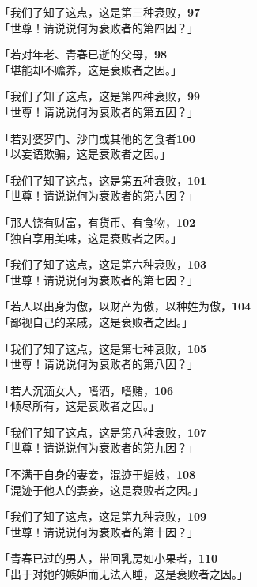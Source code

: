 「我们了知了这点，这是第三种衰败，\hfill{\grayfootnotesize \textbf{97}} \\
「世尊！请说说何为衰败者的第四因？」

「若对年老、青春已逝的父母，\hfill{\grayfootnotesize \textbf{98}} \\
「堪能却不赡养，这是衰败者之因。」


「我们了知了这点，这是第四种衰败，\hfill{\grayfootnotesize \textbf{99}} \\
「世尊！请说说何为衰败者的第五因？」

「若对婆罗门、沙门或其他的乞食者\hfill{\grayfootnotesize \textbf{100}} \\
「以妄语欺骗，这是衰败者之因。」


「我们了知了这点，这是第五种衰败，\hfill{\grayfootnotesize \textbf{101}} \\
「世尊！请说说何为衰败者的第六因？」

「那人饶有财富，有货币、有食物，\hfill{\grayfootnotesize \textbf{102}} \\
「独自享用美味，这是衰败者之因。」


「我们了知了这点，这是第六种衰败，\hfill{\grayfootnotesize \textbf{103}} \\
「世尊！请说说何为衰败者的第七因？」

「若人以出身为傲，以财产为傲，以种姓为傲，\hfill{\grayfootnotesize \textbf{104}} \\
「鄙视自己的亲戚，这是衰败者之因。」


「我们了知了这点，这是第七种衰败，\hfill{\grayfootnotesize \textbf{105}} \\
「世尊！请说说何为衰败者的第八因？」

「若人沉湎女人，嗜酒，嗜赌，\hfill{\grayfootnotesize \textbf{106}} \\
「倾尽所有，这是衰败者之因。」


「我们了知了这点，这是第八种衰败，\hfill{\grayfootnotesize \textbf{107}} \\
「世尊！请说说何为衰败者的第九因？」

「不满于自身的妻妾，混迹于娼妓，\hfill{\grayfootnotesize \textbf{108}} \\
「混迹于他人的妻妾，这是衰败者之因。」


「我们了知了这点，这是第九种衰败，\hfill{\grayfootnotesize \textbf{109}} \\
「世尊！请说说何为衰败者的第十因？」

「青春已过的男人，带回乳房如小果者，\hfill{\grayfootnotesize \textbf{110}} \\
「出于对她的嫉妒而无法入睡，这是衰败者之因。」



